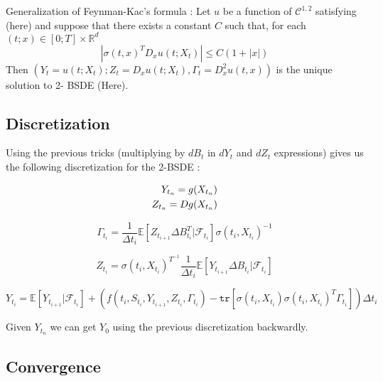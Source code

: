 \begin{prop}
	Generalization of Feynman-Kac's formula : \newline
	Let $u$ be a function of $\mathcal{C}^{1,2}$ satisfying (here) and suppose that there exists a
	constant $C$ such that, for each $(t; x) \in [0; T] \times \mathbb{R}^d$
	\begin{equation}
	|\sigma(t,x)^T D_xu(t;X_t)|\leq C(1 + |x|)
	\end{equation}
	Then $(Y_t = u(t;X_t);Z_t = D_xu(t;X_t), \Gamma_t = D^2_xu(t,x))$ is the unique solution to 2-
	BSDE (Here).
\end{prop} 


\subsection{Discretization}

Using the previous tricks (multiplying by $dB_t$ in $dY_t$ and $dZ_t$ expressions) gives us the following discretization for the 2-BSDE : 

\begin{eqnarray}
Y_{t_n} = g(X_{t_n}) \notag \\
Z_{t_n} = Dg(X_{t_n}) \notag
\end{eqnarray}


	\begin{displaymath}
	\Gamma_{t_i} = \frac{1}{\Delta t_i}\mathbb{E}[Z_{t_{i + 1}} \Delta B_{t_i}^T  | \mathcal{F}_{t_i}]\sigma(t_i, X_{t_i})^{-1}
	\end{displaymath}
	

	\begin{displaymath}
	Z_{t_i} = \sigma(t_i, X_{t_i})^{T^{-1}}\frac{1}{\Delta t_i}\mathbb{E}[Y_{t_{i + 1}} \Delta B_{t_i}  | \mathcal{F}_{t_i}]
	\end{displaymath}
	

	
	\begin{displaymath}
	Y_{t_i} = \mathbb{E}[Y_{t_{i + 1}} | \mathcal{F}_{t_i}] +  (f(t_i,S_{t_i}, Y_{t_{i + 1}}, Z_{t_i}, \Gamma_{t_i}) - \mathtt{tr}[\sigma(t_i, X_{t_i}) \sigma(t_i, X_{t_i})^T\Gamma_{t_i}])\Delta t_i
	\end{displaymath}


Given $Y_{t_n}$ we can get $Y_0$ using the previous discretization backwardly. 

\subsection{Convergence}

